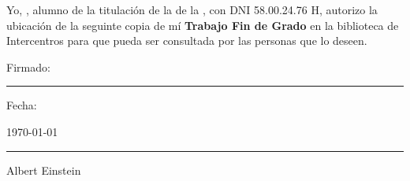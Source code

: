 \documentclass[
11pt, %
spanish, %
singlespacing, %
parskip, %
headsepline, %
chapterinoneline, %
]{./cls/TFG_TFM_EPS} %
\def \dniautor {58.00.24.76 H} %
\begin{document}

\begin{declaration}
\noindent
Yo, \textsc{\authorname}, alumno de la titulación {\degreename} de la \textit{\facname} de la \textit{\univname}, con DNI {\dniautor}, autorizo la ubicación de la seguinte copia de mí \textbf{Trabajo Fin de Grado} en la biblioteca de Intercentros para que pueda ser consultada por las personas que lo deseen.


\vspace{5em}

\noindent Firmado:\\
\rule[0.5em]{25em}{0.5pt} %
\vspace{2em}

\noindent Fecha:\\
\nopagebreak
\parbox[b]{25em}{ %
    \centering \today \\ %
    \rule[0.5em]{25em}{0.5pt} %
}
\vfill
\end{declaration}

\cleardoublepage



\vspace*{0.2\textheight}
\bigbreak
\hfill Albert Einstein





\renewcommand{\abstractname}{Resumo}
\renewcommand{\byname}{por}
\begin{abstract}[\textsc{Análise comparativa dos métodos de segmentación 2D e 3D aplicados a imaxes médicas}]
	\addchaptertocentry{\abstractname} %
	\lipsum[1]

\end{abstract}
\end{document}

